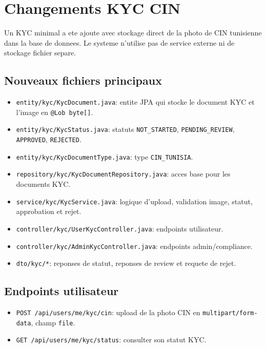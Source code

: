 \documentclass[12pt,a4paper]{article}
\begin{document}
\section{Changements KYC CIN}

Un KYC minimal a ete ajoute avec stockage direct de la photo de CIN tunisienne dans la base de donnees.
Le systeme n'utilise pas de service externe ni de stockage fichier separe.

\subsection{Nouveaux fichiers principaux}

\begin{itemize}
    \item \texttt{entity/kyc/KycDocument.java}: entite JPA qui stocke le document KYC et l'image en \texttt{@Lob byte[]}.
    \item \texttt{entity/kyc/KycStatus.java}: statuts \texttt{NOT\_STARTED}, \texttt{PENDING\_REVIEW}, \texttt{APPROVED}, \texttt{REJECTED}.
    \item \texttt{entity/kyc/KycDocumentType.java}: type \texttt{CIN\_TUNISIA}.
    \item \texttt{repository/kyc/KycDocumentRepository.java}: acces base pour les documents KYC.
    \item \texttt{service/kyc/KycService.java}: logique d'upload, validation image, statut, approbation et rejet.
    \item \texttt{controller/kyc/UserKycController.java}: endpoints utilisateur.
    \item \texttt{controller/kyc/AdminKycController.java}: endpoints admin/compliance.
    \item \texttt{dto/kyc/*}: reponses de statut, reponses de review et requete de rejet.
\end{itemize}

\subsection{Endpoints utilisateur}

\begin{itemize}
    \item \texttt{POST /api/users/me/kyc/cin}: upload de la photo CIN en \texttt{multipart/form-data}, champ \texttt{file}.
    \item \texttt{GET /api/users/me/kyc/status}: consulter son statut KYC.
\end{itemize}
\end{document}
